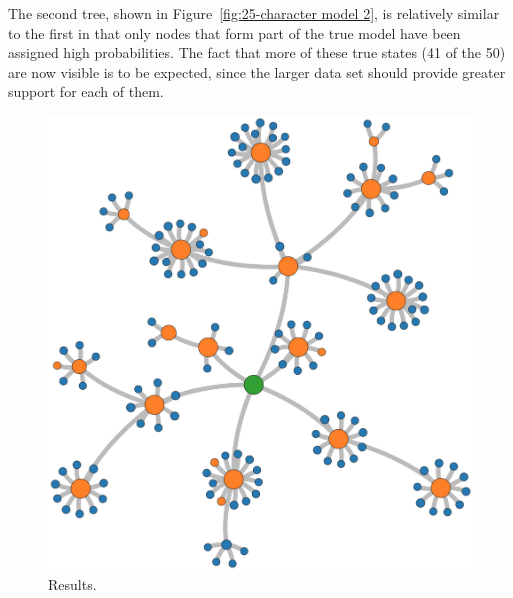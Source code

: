 \documentclass[12pt,a4paper]{article}
\begin{document}
The second tree, shown in Figure~\ref{fig:25-character model 2}, is relatively
similar to the first in that only nodes that form part of the true model have
been assigned high probabilities. The fact that more of these true states (41 of
the 50) are now visible is to be expected, since the larger data set should
provide greater support for each of them.
%
\begin{figure}[htbp]
  \includegraphics[width=\textwidth]{figures/synthetic 1}
\caption{Results.}
\label{fig:25-character model 1}
\end{figure}
%
\end{document}
